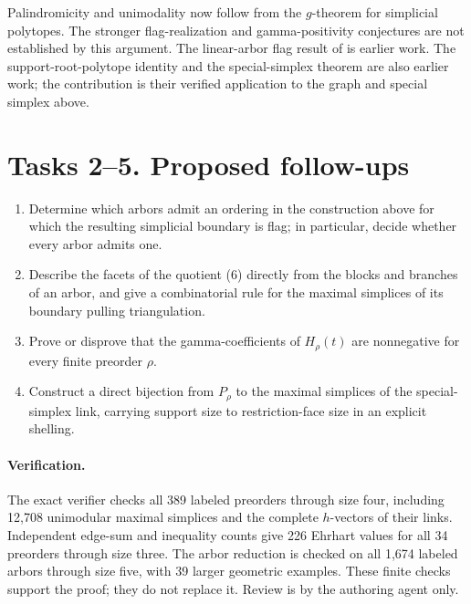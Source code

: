 \documentclass[11pt]{article}
\begin{document}
Palindromicity and unimodality now follow from the $g$-theorem for
simplicial polytopes. The stronger flag-realization and
gamma-positivity conjectures are not established by this argument.
The linear-arbor flag result of \cite{linear} is earlier work.
The support-root-polytope identity and the special-simplex theorem
are also earlier work; the contribution is their verified application
to the graph and special simplex above.

\section*{Tasks 2--5. Proposed follow-ups}
\begin{enumerate}[label=\textbf{Task \arabic*.},start=2,leftmargin=*]
\item Determine which arbors admit an ordering in the construction
above for which the resulting simplicial boundary is flag; in
particular, decide whether every arbor admits one.
\item Describe the facets of the quotient (6) directly from the
blocks and branches of an arbor, and give a combinatorial rule for
the maximal simplices of its boundary pulling triangulation.
\item Prove or disprove that the gamma-coefficients of $H_\rho(t)$
are nonnegative for every finite preorder $\rho$.
\item Construct a direct bijection from $P_\rho$ to the maximal
simplices of the special-simplex link, carrying support size to
restriction-face size in an explicit shelling.
\end{enumerate}

\paragraph{Verification.}
The exact verifier checks all 389 labeled preorders through size four,
including 12,708 unimodular maximal simplices and the complete
$h$-vectors of their links. Independent edge-sum and inequality counts
give 226 Ehrhart values for all 34 preorders through size three.
The arbor reduction is checked on all 1,674 labeled arbors through
size five, with 39 larger geometric examples. These finite checks
support the proof; they do not replace it. Review is by the authoring
agent only.
\end{document}
